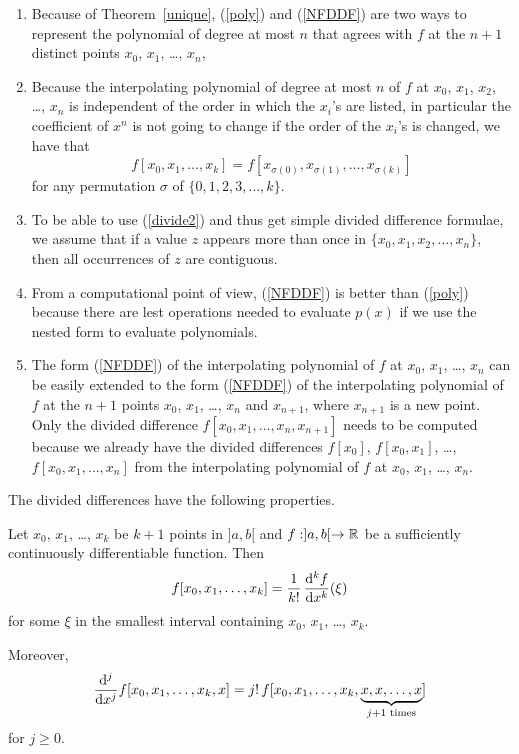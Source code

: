 \begin{rmkList}
\begin{enumerate}
\item Because of Theorem~\ref{unique}, (\ref{poly}) and (\ref{NFDDF}) are
two ways to represent the polynomial of degree at most $n$ that agrees
with $f$ at the $n+1$ distinct points $x_0$, $x_1$, \ldots, $x_n$,
\item Because the interpolating polynomial of degree at most $n$ of
$f$ at $x_0$, $x_1$, $x_2$, \ldots, $x_n$ is independent of the order
in which the $x_i$'s are listed, in particular the coefficient of
$x^n$ is not going to change if the order of the $x_i$'s is changed,
we have that
\[
f[x_0,x_1,\ldots,x_k] = f[x_{\sigma(0)},x_{\sigma(1)},\ldots,x_{\sigma(k)}]
\]
for any permutation $\sigma$ of $\{0,1,2,3,\ldots, k\}$.
\item To be able to use (\ref{divide2}) and thus get simple divided
difference formulae, we assume that if a value $z$ appears 
more than once in $\{ x_0, x_1, x_2, \ldots, x_n\}$, then all occurrences
of $z$ are contiguous.
\item From a computational point of view, (\ref{NFDDF}) is better than
(\ref{poly}) because there are lest operations needed to evaluate
$p(x)$ if we use the nested form to evaluate polynomials.
\item The form (\ref{NFDDF}) of the interpolating polynomial of $f$ at
$x_0$, $x_1$, \ldots, $x_n$ can be easily extended to the
form (\ref{NFDDF}) of the interpolating polynomial of $f$ at the
$n+1$ points $x_0$, $x_1$, \ldots, $x_n$ and $x_{n+1}$, where
$x_{n+1}$ is a new point.  Only the divided difference
$f[x_0,x_1,\ldots,x_n,x_{n+1}]$ needs to be computed because we
already have the divided differences $f[x_0]$, $f[x_0,x_1]$, \ldots,
$f[x_0,x_1,\ldots, x_n]$ from the interpolating polynomial of $f$ at
$x_0$, $x_1$, \ldots, $x_n$.
\end{enumerate}
\end{rmkList}

The divided differences have the following properties.

\begin{theorem}
Let $x_0$, $x_1$, \ldots , $x_k$ be $k+1$ points in $]a,b[$ and
$f:]a,b[\rightarrow \RR$ be a sufficiently continuously differentiable
function.  Then
\[
f[x_0,x_1,\ldots,x_k] = \frac{1}{k!}\,\dydxn{f}{x}{k}(\xi)
\]
for some $\xi$ in the smallest interval containing $x_0$, $x_1$,
\ldots , $x_k$.

Moreover,
\begin{equation}\label{derDDF}
\dfdxn{f[x_0,x_1,\ldots,x_k,x]}{x}{j} =
j!\,f[x_0,x_1,\ldots,x_k,\underbrace{x,x,\ldots,x}_{j+1 \text{ times}}]
\end{equation}
for $j\geq 0$.
\label{InterpProp}
\end{theorem}


